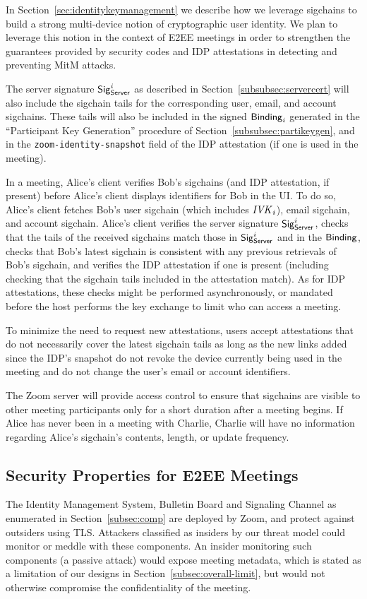 In Section~\ref{sec:identitykeymanagement} we describe how we leverage sigchains to build a strong
multi-device notion of cryptographic user identity. We plan to leverage this notion in the context
of E2EE meetings in order to strengthen the guarantees provided by security codes and IDP
attestations in detecting and preventing MitM attacks.

The server signature ${\sf Sig}^i_{\mathsf{Server}}$ as described in Section~\ref{subsubsec:servercert} will also include the
sigchain tails for the corresponding user, email, and account sigchains. These tails will also
be included in the signed ${\sf Binding}_i$ generated in the ``Participant Key Generation'' procedure of
Section~\ref{subsubsec:partikeygen}, and in the \texttt{zoom-identity-snapshot} field of the IDP
attestation (if one is used in the meeting). 

In a meeting, Alice's client verifies Bob's sigchains (and IDP attestation, if present) before
Alice's client displays identifiers for Bob in the UI. To do so, Alice's client fetches Bob's user
sigchain (which includes $\mathit{IVK}_i$), email sigchain, and account sigchain. Alice's client
verifies the server signature ${\sf Sig}^i_{\mathsf{Server}}$, checks that the tails
of the received sigchains match those in ${\sf Sig}^i_{\mathsf{Server}}$ and in the
${\sf Binding}$, checks that Bob's latest sigchain is consistent with any previous
retrievals of Bob's sigchain, and verifies the IDP attestation if one is present
(including checking that the sigchain tails included in the attestation match).
As for IDP attestations, these checks might be performed asynchronously, or
mandated before the host performs the key exchange to limit who can access a
meeting.

To minimize the need to request new attestations, users accept attestations that
do not necessarily cover the latest sigchain tails as long as the new links
added since the IDP's snapshot do not revoke the device currently being used in
the meeting and do not change the user's email or account identifiers.

The Zoom server will provide access control to ensure that sigchains are visible to other meeting
participants only for a short duration after a meeting begins. If Alice has never been in a meeting
with Charlie, Charlie will have no information regarding Alice's sigchain's contents, length, or
update frequency.

\subsection{Security Properties for E2EE Meetings}
\label{subsec:secprop}
The Identity Management System, Bulletin Board and Signaling Channel as enumerated in
Section~\ref{subsec:comp} are deployed by Zoom, and protect against outsiders using TLS. Attackers
classified as insiders by our threat model could monitor or meddle with these components. An insider
monitoring such components (a passive attack) would expose meeting metadata, which is stated as a
limitation of our designs in Section~\ref{subsec:overall-limit}, but would not otherwise compromise
the confidentiality of the meeting.

